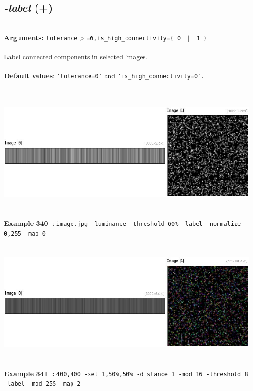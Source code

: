 \documentclass[a4paper,11pt,twoside]{book}
\begin{document}
\subsection{\emph{-label} (+)}\vspace*{-0.5em}
~\\\textbf{Arguments: } 
{\small \texttt{tolerance$>$=0,is\_high\_connectivity=\{ 0 ~$|$~ 1 \}}}\\~\\
Label connected components in selected images.
~\\~\\\textbf{Default values}: {\small \texttt{'tolerance=0'} and \texttt{'is\_high\_connectivity=0'.}}
\begin{center}\includegraphics[keepaspectratio=true,height=7cm,width=\textwidth]{img/gmic_def340.jpg}\\
{\footnotesize \textbf{Example 340~:} \texttt{image.jpg -luminance -threshold 60\% -label -normalize 0,255 -map 0}}
\\\includegraphics[keepaspectratio=true,height=7cm,width=\textwidth]{img/gmic_def341.jpg}\\
{\footnotesize \textbf{Example 341~:} \texttt{400,400 -set 1,50\%,50\% -distance 1 -mod 16 -threshold 8 -label -mod 255 -map 2}}
\end{center}
\end{document}
